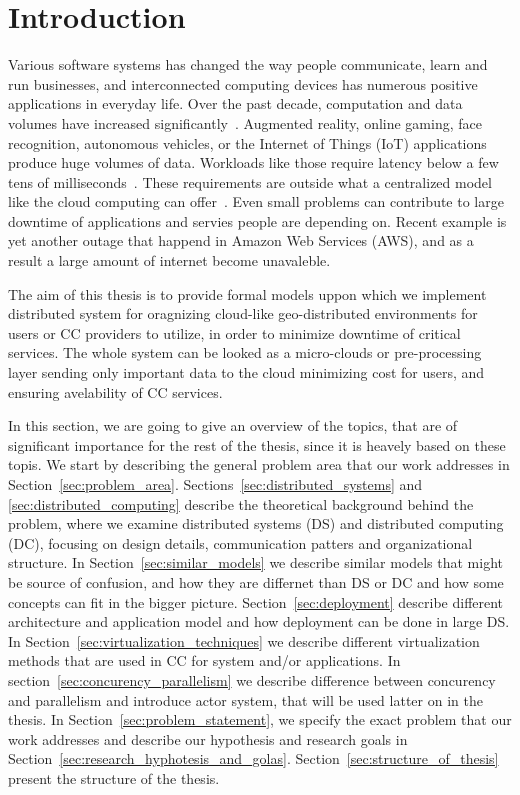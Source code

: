 \pagestyle{fancy}
\fancyhf{}
\fancyhead[RE,LO]{\leftmark}
\fancyfoot[CE,CO]{\thepage}
\chapter{Introduction}\label{chapter:Intro}
%
Various software systems has changed the way people communicate, learn and run businesses, and interconnected computing devices has numerous positive applications in everyday life. Over the past decade, computation and data volumes have increased significantly~\cite{ChiangZ16}. Augmented reality, online gaming, face recognition, autonomous vehicles, or the Internet of Things (IoT) applications produce huge volumes of data. Workloads like those require latency below a few tens of milliseconds~\cite{ChiangZ16}. These requirements are outside what a centralized model like the cloud computing can offer~\cite{ChiangZ16}. Even small problems can contribute to large downtime of applications and servies people are depending on. Recent example is yet another outage that happend in Amazon Web Services (AWS), and as a result a large amount of internet become unavaleble.

The aim of this thesis is to provide formal models uppon which we implement distributed system for oragnizing cloud-like geo-distributed environments for users or CC providers to utilize, in order to minimize downtime of critical services. The whole system can be looked as a micro-clouds or pre-processing layer sending only important data to the cloud minimizing cost for users, and ensuring avelability of CC services.

In this section, we are going to give an overview of the topics, that are of significant importance for the rest of the thesis, since it is heavely based on these topis. We start by describing the general problem area that our work addresses in Section~\ref{sec:problem_area}. Sections~\ref{sec:distributed_systems} and \ref{sec:distributed_computing} describe the theoretical background behind the problem, where we examine distributed systems (DS) and distributed computing (DC), focusing on design details, communication patters and organizational structure. In Section~\ref{sec:similar_models} we describe similar models that might be source of confusion, and how they are differnet than DS or DC and how some concepts can fit in the bigger picture. Section~\ref{sec:deployment} describe different architecture and application model and how deployment can be done in large DS. In Section~\ref{sec:virtualization_techniques} we describe different virtualization methods that are used in CC for system and/or applications. In section~\ref{sec:concurency_parallelism} we describe difference between concurency and parallelism and introduce actor system, that will be used latter on in the thesis. In Section~\ref{sec:problem_statement}, we specify the exact problem that our work addresses and describe our hypothesis and research goals in Section~\ref{sec:research_hyphotesis_and_golas}. Section~\ref{sec:structure_of_thesis} present the structure of the thesis.
%
%
%
